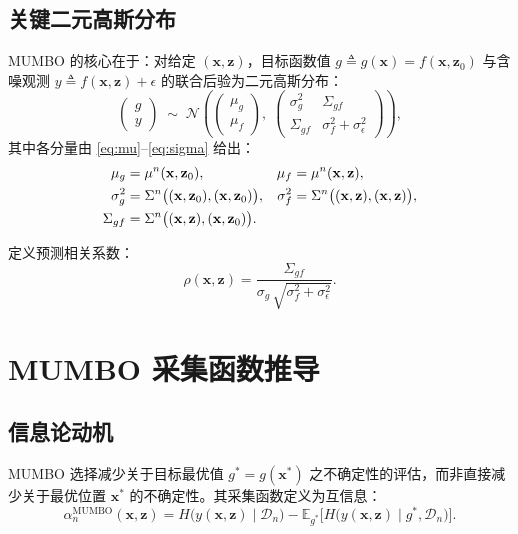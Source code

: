 \documentclass[11pt,a4paper]{article}
\newcommand{\bx}{\mathbf{x}}
\newcommand{\bz}{\mathbf{z}}
\newcommand{\cD}{\mathcal{D}}
\begin{document}
\subsection{关键二元高斯分布}

MUMBO 的核心在于：对给定 $(\bx,\bz)$，目标函数值 $g\triangleq g(\bx)=f(\bx,\bz_0)$ 与含噪观测 $y\triangleq f(\bx,\bz)+\epsilon$ 的联合后验为二元高斯分布：
\begin{equation}\label{eq:bivariate}
  \begin{pmatrix} g \\ y \end{pmatrix}
  \;\sim\;
  \mathcal{N}\!\left(
  \begin{pmatrix} \mu_g \\ \mu_f \end{pmatrix},\;
  \begin{pmatrix} \sigma_g^2 & \Sigma_{gf} \\ \Sigma_{gf} & \sigma_f^2+\sigma_\epsilon^2 \end{pmatrix}
  \right),
\end{equation}
其中各分量由 \eqref{eq:mu}--\eqref{eq:sigma} 给出：
\begin{align}
  \mu_g &= \mu^n(\bx,\bz_0), &
  \mu_f &= \mu^n(\bx,\bz), \notag\\
  \sigma_g^2 &= \Sigma^n\bigl((\bx,\bz_0),(\bx,\bz_0)\bigr), &
  \sigma_f^2 &= \Sigma^n\bigl((\bx,\bz),(\bx,\bz)\bigr), \notag\\
  \Sigma_{gf} &= \Sigma^n\bigl((\bx,\bz),(\bx,\bz_0)\bigr). \notag
\end{align}

定义预测相关系数：
\begin{equation}\label{eq:rho}
  \rho(\bx,\bz) = \frac{\Sigma_{gf}}{\sigma_g\,\sqrt{\sigma_f^2+\sigma_\epsilon^2}}.
\end{equation}

\section{MUMBO 采集函数推导}

\subsection{信息论动机}

MUMBO 选择减少关于目标最优值 $g^*=g(\bx^*)$ 之不确定性的评估，而非直接减少关于最优位置 $\bx^*$ 的不确定性。其采集函数定义为互信息：
\begin{equation}\label{eq:mumbo-def}
  \alpha_n^{\mathrm{MUMBO}}(\bx,\bz)
  = H\bigl(y(\bx,\bz)\mid\cD_n\bigr)
    - \mathbb{E}_{g^*}\!\bigl[H\bigl(y(\bx,\bz)\mid g^*,\cD_n\bigr)\bigr].
\end{equation}
\end{document}
